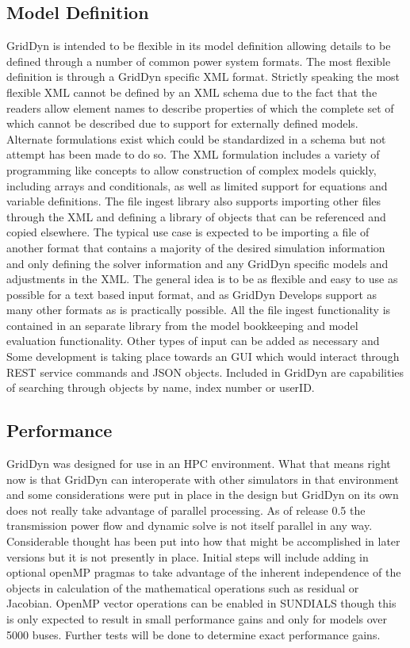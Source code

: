 \documentclass[12pt]{article} %
\begin{document}
\subsection{Model Definition}
GridDyn is intended to be flexible in its model definition allowing details to be defined through a number of common power system formats.  The most flexible definition is through a GridDyn specific XML format.  Strictly speaking the most flexible XML cannot be defined by an XML schema due to the fact that the readers allow element names to describe properties of which the complete set of which cannot be described due to support for externally defined models.  Alternate formulations exist which could be standardized in a schema but not attempt has been made to do so.  The XML formulation includes a variety of programming like concepts to allow construction of complex models quickly, including arrays and conditionals, as well as limited support for equations and variable definitions.  The file ingest library also supports importing other files through the XML and defining a library of objects that can be referenced and copied elsewhere.  The typical use case is expected to be importing a file of another format that contains a majority of the desired simulation information and only defining the solver information and any GridDyn specific models and adjustments in the XML.  The general idea is to be as flexible and easy to use as possible for a text based input format, and as GridDyn Develops support as many other formats as is practically possible.  All the file ingest functionality is contained in an separate library from the model bookkeeping and model evaluation functionality.   Other types of input can be added as necessary and Some development is taking place towards an GUI which would interact through REST service commands and JSON objects.  Included in GridDyn are capabilities of searching through objects by name, index number or userID.  

\subsection{Performance}
GridDyn was designed for use in an HPC environment.  What that means right now is that GridDyn can interoperate with other simulators in that environment and some considerations were put in place in the design but GridDyn on its own does not really take advantage of parallel processing.  As of release 0.5 the transmission power flow and dynamic solve is not itself parallel in any way.  Considerable thought has been put into how that might be accomplished in later versions but it is not presently in place.  Initial steps will include adding in optional openMP pragmas to take advantage of the inherent independence of the objects in calculation of the mathematical operations such as residual or Jacobian.  OpenMP vector operations can be enabled in SUNDIALS though this is only expected to result in small performance gains and only for models over 5000 buses.  Further tests will be done to determine exact performance gains.  
\end{document}
